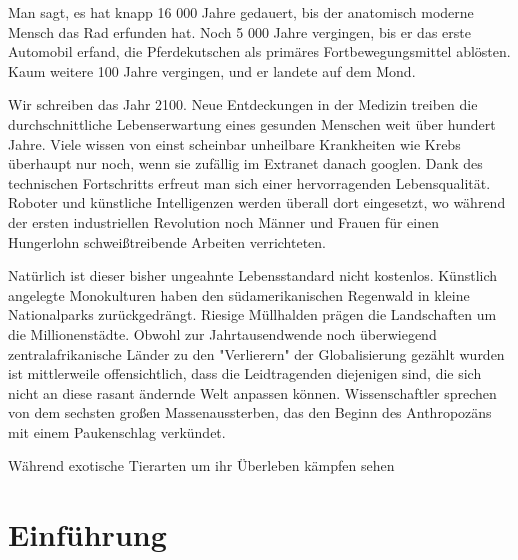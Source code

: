 Man sagt, es hat knapp 16 000 Jahre gedauert, bis der anatomisch moderne Mensch das Rad erfunden hat.
Noch 5 000 Jahre vergingen, bis er das erste Automobil erfand, die Pferdekutschen als primäres Fortbewegungsmittel ablösten.
Kaum weitere 100 Jahre vergingen, und er landete auf dem Mond.

Wir schreiben das Jahr 2100.
Neue Entdeckungen in der Medizin treiben die durchschnittliche Lebenserwartung eines gesunden Menschen weit über hundert Jahre.
Viele wissen von einst scheinbar unheilbare Krankheiten wie Krebs überhaupt nur noch, wenn sie zufällig im Extranet danach googlen.
Dank des technischen Fortschritts erfreut man sich einer hervorragenden Lebensqualität.
Roboter und künstliche Intelligenzen werden überall dort eingesetzt,
wo während der ersten industriellen Revolution noch Männer und Frauen für einen Hungerlohn schweißtreibende Arbeiten verrichteten.

Natürlich ist dieser bisher ungeahnte Lebensstandard nicht kostenlos. Künstlich angelegte Monokulturen haben den südamerikanischen Regenwald in kleine Nationalparks zurückgedrängt.
Riesige Müllhalden prägen die Landschaften um die Millionenstädte. Obwohl zur Jahrtausendwende noch überwiegend zentralafrikanische Länder zu den "Verlierern" der Globalisierung gezählt wurden
ist mittlerweile offensichtlich, dass die Leidtragenden diejenigen sind, die sich nicht an diese rasant ändernde Welt anpassen können.
Wissenschaftler sprechen von dem sechsten großen Massenaussterben, das den Beginn des Anthropozäns mit einem Paukenschlag verkündet.

Während exotische Tierarten um ihr Überleben kämpfen sehen


\section{Einführung}
